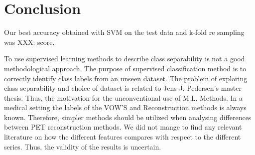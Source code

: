 \section{Conclusion}





Our best accuracy obtained with SVM on the test data and k-fold re sampling
was XXX: score.

To use supervised learning methods to describe class separability is not a
good methodological approach. The purpose of supervised classification
method is to correctly identify class labels from an unseen dataset.     
The problem of exploring class separability and choice of dataset is
related to Jens J. Pedersen's master thesis. Thus, the motivation for the 
unconventional use of M.L. Methods. In a medical setting the labels of the
VOW'S and Reconstruction methods is always known. Therefore, simpler methods
should be utilized when analysing differences between PET reconstruction
methods. We did not mange to find any relevant literature on how the different features compares
with respect to the different series. Thus, the validity of the results is
uncertain. 
 




% 
